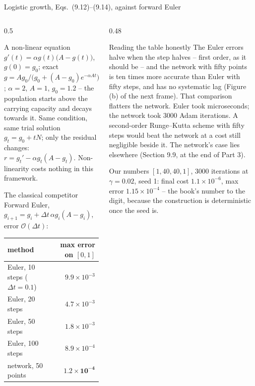 \documentclass[10pt,aspectratio=169]{beamer}
\begin{document}
\begin{frame}{Logistic growth, Eqs.~(9.12)--(9.14), against forward Euler}
\small
\begin{columns}[T]
\begin{column}{0.5\textwidth}
\begin{block}{A non-linear equation}
\footnotesize
$g'(t)=\alpha g(t)\bigl(A-g(t)\bigr)$, $g(0)=g_0$; exact
$g=Ag_0/\bigl(g_0+(A-g_0)e^{-\alpha At}\bigr)$; $\alpha=2$, $A=1$,
$g_0=1.2$ -- the population starts above the carrying capacity and decays
towards it.  Same condition, same trial solution $g_t=g_0+tN$; only the
residual changes: $r=g_t'-\alpha g_t(A-g_t)$.  Non-linearity costs nothing
in this framework.
\end{block}
\begin{block}{The classical competitor}
\footnotesize
Forward Euler, $g_{i+1}=g_i+\Delta t\,\alpha g_i(A-g_i)$, error
$\mathcal{O}(\Delta t)$:
\begin{center}
\scriptsize
\begin{tabular}{@{}lr@{}}
\toprule
method & max error on $[0,1]$\\
\midrule
Euler, 10 steps ($\Delta t=0.1$) & $9.9\times10^{-3}$\\
Euler, 20 steps & $4.7\times10^{-3}$\\
Euler, 50 steps & $1.8\times10^{-3}$\\
Euler, 100 steps & $8.9\times10^{-4}$\\
network, 50 points & $\mathbf{1.2\times10^{-4}}$\\
\bottomrule
\end{tabular}
\end{center}
\end{block}
\end{column}
\begin{column}{0.48\textwidth}
\begin{block}{Reading the table honestly}
\scriptsize
The Euler errors halve when the step halves -- first order, as it should
be -- and the network with fifty points is ten times more accurate than
Euler with fifty steps, and has no systematic lag (Figure (b) of the next
frame).  That comparison flatters the network.  Euler took microseconds; the
network took $3000$ Adam iterations.  A second-order Runge--Kutta scheme
with fifty steps would beat the network at a cost still negligible beside
it.  The network's case lies elsewhere (Section 9.9, at the end of Part 3).
\end{block}
\begin{block}{Our numbers}
\scriptsize
$[1,40,40,1]$, $3000$ iterations at $\gamma=0.02$, seed 1: final cost
$1.1\times10^{-6}$, max error $1.15\times10^{-4}$ -- the book's number to
the digit, because the construction is deterministic once the seed is.
\end{block}
\end{column}
\end{columns}
\end{frame}
\end{document}
